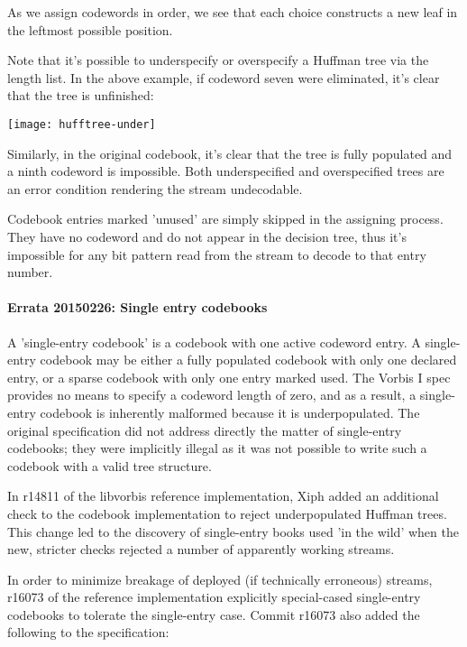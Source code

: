 As we assign codewords in order, we see that each choice constructs a
new leaf in the leftmost possible position.

Note that it's possible to underspecify or overspecify a Huffman tree
via the length list.  In the above example, if codeword seven were
eliminated, it's clear that the tree is unfinished:

\begin{center}
\texttt{[image: hufftree-under]}
\end{center}


Similarly, in the original codebook, it's clear that the tree is fully
populated and a ninth codeword is impossible.  Both underspecified and
overspecified trees are an error condition rendering the stream
undecodable.

Codebook entries marked 'unused' are simply skipped in the assigning
process.  They have no codeword and do not appear in the decision
tree, thus it's impossible for any bit pattern read from the stream to
decode to that entry number.

\paragraph{Errata 20150226: Single entry codebooks}

A 'single-entry codebook' is a codebook with one active codeword
entry. A single-entry codebook may be either a fully populated
codebook with only one declared entry, or a sparse codebook with only
one entry marked used. The Vorbis I spec provides no means to specify
a codeword length of zero, and as a result, a single-entry codebook is
inherently malformed because it is underpopulated.  The original
specification did not address directly the matter of single-entry
codebooks; they were implicitly illegal as it was not possible to
write such a codebook with a valid tree structure.

In r14811 of the libvorbis reference implementation, Xiph added an
additional check to the codebook implementation to reject
underpopulated Huffman trees. This change led to the discovery of
single-entry books used 'in the wild' when the new, stricter checks
rejected a number of apparently working streams.

In order to minimize breakage of deployed (if technically erroneous)
streams, r16073 of the reference implementation explicitly
special-cased single-entry codebooks to tolerate the single-entry
case.  Commit r16073 also added the following to the specification:

